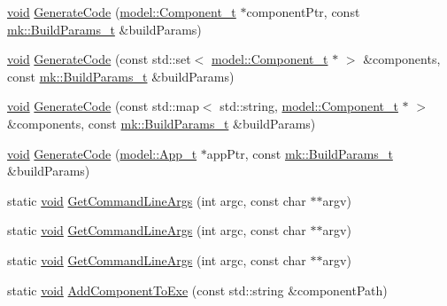 \begin{DoxyCompactItemize}
\item 
\hyperlink{_t_e_m_p_l_a_t_e__cdef_8h_ac9c84fa68bbad002983e35ce3663c686}{void} \hyperlink{namespacecli_a10febdedb75bc753ace72299f10c495b}{Generate\+Code} (\hyperlink{structmodel_1_1_component__t}{model\+::\+Component\+\_\+t} $\ast$component\+Ptr, const \hyperlink{structmk_1_1_build_params__t}{mk\+::\+Build\+Params\+\_\+t} \&build\+Params)
\item 
\hyperlink{_t_e_m_p_l_a_t_e__cdef_8h_ac9c84fa68bbad002983e35ce3663c686}{void} \hyperlink{namespacecli_ae1cb1dfa860f3ba92dcff22cc4d657b3}{Generate\+Code} (const std\+::set$<$ \hyperlink{structmodel_1_1_component__t}{model\+::\+Component\+\_\+t} $\ast$ $>$ \&components, const \hyperlink{structmk_1_1_build_params__t}{mk\+::\+Build\+Params\+\_\+t} \&build\+Params)
\item 
\hyperlink{_t_e_m_p_l_a_t_e__cdef_8h_ac9c84fa68bbad002983e35ce3663c686}{void} \hyperlink{namespacecli_ad4ce0b41600f30b3e08434bbccdfaf1e}{Generate\+Code} (const std\+::map$<$ std\+::string, \hyperlink{structmodel_1_1_component__t}{model\+::\+Component\+\_\+t} $\ast$ $>$ \&components, const \hyperlink{structmk_1_1_build_params__t}{mk\+::\+Build\+Params\+\_\+t} \&build\+Params)
\item 
\hyperlink{_t_e_m_p_l_a_t_e__cdef_8h_ac9c84fa68bbad002983e35ce3663c686}{void} \hyperlink{namespacecli_a30b4b6279a8656c07195b794d6e0506e}{Generate\+Code} (\hyperlink{structmodel_1_1_app__t}{model\+::\+App\+\_\+t} $\ast$app\+Ptr, const \hyperlink{structmk_1_1_build_params__t}{mk\+::\+Build\+Params\+\_\+t} \&build\+Params)
\item 
static \hyperlink{_t_e_m_p_l_a_t_e__cdef_8h_ac9c84fa68bbad002983e35ce3663c686}{void} \hyperlink{namespacecli_a0e01107bd4179dadcb92d3a20380163b}{Get\+Command\+Line\+Args} (int argc, const char $\ast$$\ast$argv)
\item 
static \hyperlink{_t_e_m_p_l_a_t_e__cdef_8h_ac9c84fa68bbad002983e35ce3663c686}{void} \hyperlink{namespacecli_a0e01107bd4179dadcb92d3a20380163b}{Get\+Command\+Line\+Args} (int argc, const char $\ast$$\ast$argv)
\item 
static \hyperlink{_t_e_m_p_l_a_t_e__cdef_8h_ac9c84fa68bbad002983e35ce3663c686}{void} \hyperlink{namespacecli_a0e01107bd4179dadcb92d3a20380163b}{Get\+Command\+Line\+Args} (int argc, const char $\ast$$\ast$argv)
\item 
static \hyperlink{_t_e_m_p_l_a_t_e__cdef_8h_ac9c84fa68bbad002983e35ce3663c686}{void} \hyperlink{namespacecli_a6ac36798566cf5fbbe27ff68ae78ac58}{Add\+Component\+To\+Exe} (const std\+::string \&component\+Path)
$$
\end{DoxyCompactItemize}
